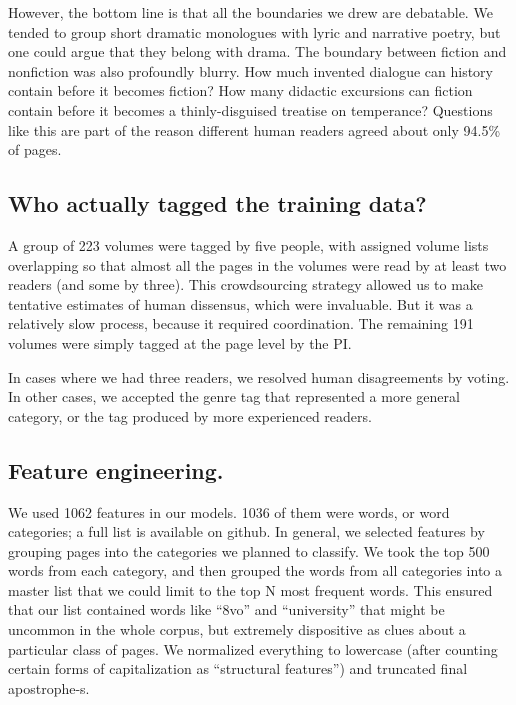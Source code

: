 \documentclass[paper=a4, fontsize=12pt]{scrartcl}
\numberwithin{equation}{section}		%
\numberwithin{figure}{section}			%
\numberwithin{table}{section}				%
\begin{document}
However, the bottom line is that all the boundaries we drew are debatable. We tended to group short dramatic monologues with lyric and narrative poetry, but one could argue that they belong with drama. The boundary between fiction and nonfiction was also profoundly blurry. How much invented dialogue can history contain before it becomes fiction? How many didactic excursions can fiction contain before it becomes a thinly-disguised treatise on temperance? Questions like this are part of the reason different human readers agreed about only 94.5\% of pages.

\subsection{Who actually tagged the training data?}
A group of 223 volumes were tagged by five people, with assigned volume lists overlapping so that almost all the pages in the volumes were read by at least two readers (and some by three). This crowdsourcing strategy allowed us to make tentative estimates of human dissensus, which were invaluable. But it was a relatively slow process, because it required coordination. The remaining 191 volumes were simply tagged at the page level by the PI.

In cases where we had three readers, we resolved human disagreements by voting. In other cases, we accepted the genre tag that represented a more general category, or the tag produced by more experienced readers.

\subsection{Feature engineering.}

We used 1062 features in our models. 1036 of them were words, or word categories; a full list is available on github. In general, we selected features by grouping pages into the categories we planned to classify. We took the top 500 words from each category, and then grouped the words from all categories into a master list that we could limit to the top N most frequent words. This ensured that our list contained words like ``8vo'' and ``university'' that might be uncommon in the whole corpus, but extremely dispositive as clues about a particular class of pages. We normalized everything to lowercase (after counting certain forms of capitalization as ``structural features'') and truncated final apostrophe-s.
\end{document}
